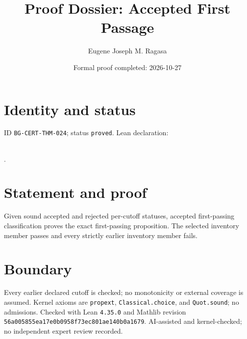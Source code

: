 \documentclass[11pt]{article}
\title{Proof Dossier: Accepted First Passage}\author{Eugene Joseph M. Ragasa}\date{Formal proof completed: 2026-10-27}
\begin{document}
\maketitle
\section{Identity and status}
ID \texttt{BG-CERT-THM-024}; status \texttt{proved}. Lean declaration:
\par{}\\
{\tiny{}}.
\section{Statement and proof}
Given sound accepted and rejected per-cutoff statuses, accepted first-passing
classification proves the exact first-passing proposition. The selected inventory member
passes and every strictly earlier inventory member fails.
\section{Boundary}
Every earlier declared cutoff is checked; no monotonicity or external coverage is assumed.
Kernel axioms are \texttt{propext}, \texttt{Classical.choice}, and \texttt{Quot.sound};
no admissions. Checked with Lean \texttt{4.35.0} and Mathlib revision
\texttt{56a005855ea17e0b0958f73ec801ae140b0a1679}. AI-assisted and kernel-checked;
no independent expert review recorded.
\end{document}
